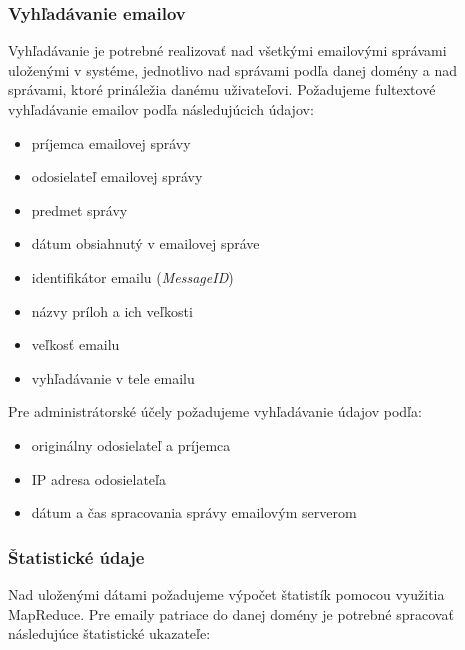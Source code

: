 \documentclass[11pt,twoside,a4paper]{book}
\begin{document}
\subsubsection*{Vyhľadávanie emailov}
Vyhľadávanie je potrebné realizovať nad všetkými emailovými správami uloženými v systéme, jednotlivo nad správami podľa danej domény a nad správami, ktoré prináležia danému uživateľovi. Požadujeme fultextové vyhľadávanie emailov podľa následujúcich údajov:
\begin{itemize}
 \item
  príjemca emailovej správy
 \item
  odosielateľ emailovej správy
 \item
  predmet správy
 \item
  dátum obsiahnutý v emailovej správe
 \item
  identifikátor emailu (\emph{MessageID})
 \item
  názvy príloh a ich veľkosti %
 \item
  veľkosť emailu
 \item
  vyhľadávanie v tele emailu
\end{itemize}

\newpage
\noindent
Pre administrátorské účely požadujeme vyhľadávanie údajov podľa: %
\begin{itemize}
 \item originálny odosielateľ a príjemca
 \item IP adresa odosielateľa
 \item dátum a čas spracovania správy emailovým serverom
\end{itemize}


\subsubsection*{Štatistické údaje}
Nad uloženými dátami požadujeme výpočet štatistík pomocou využitia MapReduce. Pre emaily patriace do danej domény je potrebné spracovať následujúce štatistické ukazateľe:
\end{document}
